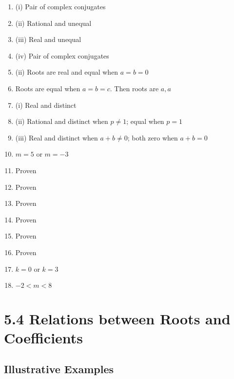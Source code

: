 \documentclass[12pt,a4paper]{article}
\begin{document}
\begin{enumerate}
    \item (i) Pair of complex conjugates
    \item (ii) Rational and unequal
    \item (iii) Real and unequal
    \item (iv) Pair of complex conjugates
    \item (ii) Roots are real and equal when \( a = b = 0 \)
    \item Roots are equal when \( a = b = c \). Then roots are \( a, a \)
    \item (i) Real and distinct
    \item (ii) Rational and distinct when \( p \neq 1 \); equal when \( p = 1 \)
    \item (iii) Real and distinct when \( a + b \neq 0 \); both zero when \( a + b = 0 \)
    \item \( m = 5 \) or \( m = -3 \)
    \item Proven
    \item Proven
    \item Proven
    \item Proven
    \item Proven
    \item Proven
    \item \( k = 0 \) or \( k = 3 \)
    \item \( -2 < m < 8 \)
\end{enumerate}

\section{5.4 Relations between Roots and Coefficients}

\subsection{Illustrative Examples}
\end{document}
